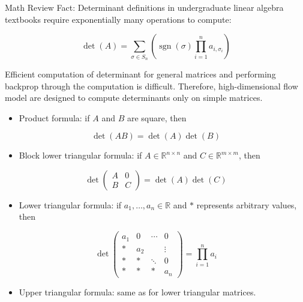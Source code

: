 \begin{frame}[allowframebreaks]

\begin{myconceptblock}{10.18}{Math Review}
    Fact: Determinant definitions in undergraduate linear algebra textbooks require exponentially many operations to compute:

    $$
    \operatorname{det}(A)=\sum_{\sigma \in S_{n}}\left(\operatorname{sgn}(\sigma) \prod_{i=1}^{n} a_{i, \sigma_{i}}\right)
    $$

    Efficient computation of determinant for general matrices and performing backprop through the computation is difficult. Therefore, high-dimensional flow model are designed to compute determinants only on simple matrices.

    \begin{itemize}
        \item Product formula: if $A$ and $B$ are square, then
    \end{itemize}

    $$
    \operatorname{det}(A B)=\operatorname{det}(A) \operatorname{det}(B)
    $$

    \begin{itemize}
        \item Block lower triangular formula: if $A \in \mathbb{R}^{n \times n}$ and $C \in \mathbb{R}^{m \times m}$, then
    \end{itemize}

    $$
    \operatorname{det}\left(\begin{array}{ll}
    A & 0 \\
    B & C
    \end{array}\right)=\operatorname{det}(A) \operatorname{det}(C)
    $$

    \begin{itemize}
        \item Lower triangular formula: if $a_{1}, \ldots, a_{n} \in \mathbb{R}$ and $*$ represents arbitrary values, then
    \end{itemize}

    $$
    \operatorname{det}\left(\begin{array}{cccc}
    a_{1} & 0 & \cdots & 0 \\
    * & a_{2} & & \vdots \\
    * & * & \ddots & 0 \\
    * & * & * & a_{n}
    \end{array}\right)=\prod_{i=1}^{n} a_{i}
    $$

    \begin{itemize}
        \item Upper triangular formula: same as for lower triangular matrices.
    \end{itemize}
\end{myconceptblock}

\end{frame}

